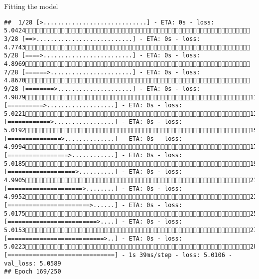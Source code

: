 \documentclass[
  ignorenonframetext,
]{beamer}
\begin{document}
\begin{frame}[fragile]{Fitting the model}
\begin{verbatim}
##  1/28 [>.............................] - ETA: 0s - loss: 5.0424 3/28 [==>...........................] - ETA: 0s - loss: 4.7743 5/28 [====>.........................] - ETA: 0s - loss: 4.8969 7/28 [======>.......................] - ETA: 0s - loss: 4.8670 9/28 [========>.....................] - ETA: 0s - loss: 4.987911/28 [==========>...................] - ETA: 0s - loss: 5.022113/28 [============>.................] - ETA: 0s - loss: 5.019215/28 [===============>..............] - ETA: 0s - loss: 4.999417/28 [=================>............] - ETA: 0s - loss: 5.018519/28 [===================>..........] - ETA: 0s - loss: 4.990521/28 [=====================>........] - ETA: 0s - loss: 4.995223/28 [=======================>......] - ETA: 0s - loss: 5.017525/28 [=========================>....] - ETA: 0s - loss: 5.015327/28 [===========================>..] - ETA: 0s - loss: 5.022328/28 [==============================] - 1s 39ms/step - loss: 5.0106 - val_loss: 5.0589
## Epoch 169/250

\end{verbatim}
\end{frame}
\end{document}
